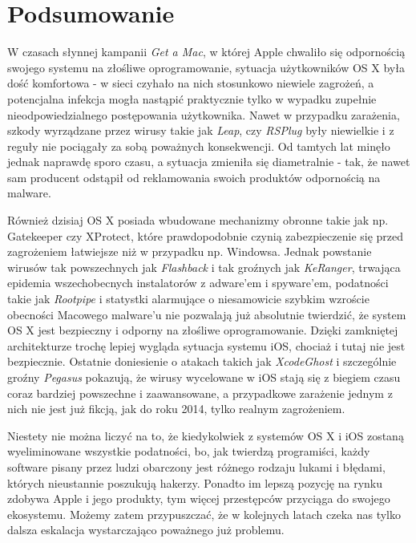 \documentclass[polish]{kbk}
\begin{document}
\section{Podsumowanie}
W czasach słynnej kampanii \textit{Get a Mac}, w której Apple chwaliło się odpornością swojego systemu na złośliwe oprogramowanie, sytuacja użytkowników OS X była dość komfortowa - w sieci czyhało na nich stosunkowo niewiele zagrożeń, a potencjalna infekcja mogła nastąpić praktycznie tylko w wypadku zupełnie nieodpowiedzialnego postępowania użytkownika. Nawet w przypadku zarażenia, szkody wyrządzane przez wirusy takie jak \textit{Leap}, czy \textit{RSPlug} były niewielkie i z reguły nie pociągały za sobą poważnych konsekwencji. Od tamtych lat minęło jednak naprawdę sporo czasu, a sytuacja zmieniła się diametralnie - tak, że nawet sam producent odstąpił od reklamowania swoich produktów odpornością na malware.

Również dzisiaj OS X posiada wbudowane mechanizmy obronne takie jak np. Gatekeeper czy XProtect, które prawdopodobnie czynią zabezpieczenie się przed zagrożeniem łatwiejsze niż w przypadku np. Windowsa. Jednak powstanie wirusów tak powszechnych jak \textit{Flashback} i tak groźnych jak \textit{KeRanger}, trwająca epidemia wszechobecnych instalatorów z adware'em i spyware'em, podatności takie jak \textit{Rootpipe} i statystki alarmujące o niesamowicie szybkim wzroście obecności Macowego malware'u nie pozwalają już absolutnie twierdzić, że system OS X jest bezpieczny i odporny na złośliwe oprogramowanie.  Dzięki zamkniętej architekturze trochę lepiej wygląda sytuacja systemu iOS, chociaż i tutaj nie jest bezpiecznie. Ostatnie doniesienie o atakach takich jak \textit{XcodeGhost} i szczególnie groźny \textit{Pegasus} pokazują, że wirusy wycelowane w iOS stają się z biegiem czasu coraz bardziej powszechne i zaawansowane, a przypadkowe zarażenie jednym z nich nie jest już fikcją, jak do roku 2014, tylko realnym zagrożeniem. 

Niestety nie można liczyć na to, że kiedykolwiek z systemów OS X i iOS zostaną wyeliminowane wszystkie podatności, bo, jak twierdzą programiści, każdy software pisany przez ludzi obarczony jest różnego rodzaju lukami i błędami, których nieustannie poszukują hakerzy. Ponadto im lepszą pozycję na rynku zdobywa Apple i jego produkty, tym więcej przestępców przyciąga do swojego ekosystemu. Możemy zatem przypuszczać, że w kolejnych latach czeka nas tylko dalsza eskalacja wystarczająco poważnego już problemu.
\end{document}
